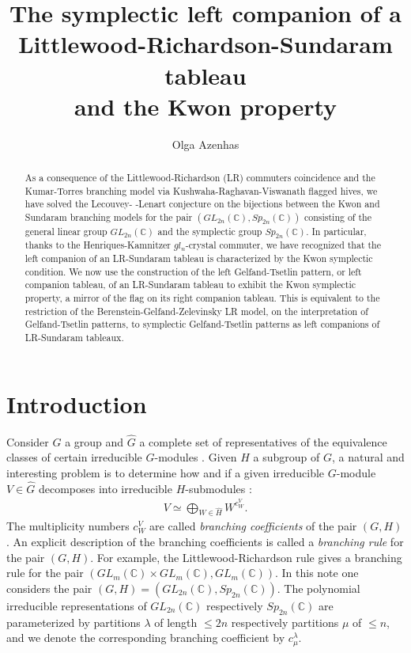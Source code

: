 \documentclass[reqno]{amsart}
\title[The symplectic left companion  of a  LR-Sundaram tableau and the Kwon condition] {The symplectic left companion  of a  Littlewood-Richardson-Sundaram  tableau \\and the Kwon property}
\author{Olga Azenhas}
\theoremstyle{tplain}
\begin{document}
\begin{abstract} As a consequence of the Littlewood-Richardson (LR) commuters coincidence and the Kumar-Torres branching model  via  Kushwaha-Raghavan-Viswanath flagged hives, we have solved the Lecouvey- -Lenart conjecture on the  bijections between the Kwon and Sundaram
  branching models for the pair $({GL}_{2n}(\mathbb{C}), {Sp}_{2n}(\mathbb{C})) $ consisting of  the  general linear group ${GL}_{2n}(\mathbb{C})$
and the symplectic group ${Sp}_{2n}(\mathbb{C})$. In particular, thanks to the Henriques-Kamnitzer $gl_n$-crystal commuter, we have   recognized that the left companion of an LR-Sundaram tableau is characterized by the   Kwon  symplectic condition. We now use the construction of the left Gelfand-Tsetlin pattern, or left companion tableau, of an LR-Sundaram tableau to exhibit the Kwon symplectic property, a mirror of the flag on its right companion tableau. This is equivalent to the  restriction of the Berenstein-Gelfand-Zelevinsky LR model, on the interpretation of Gelfand-Tsetlin patterns, to symplectic Gelfand-Tsetlin patterns as left companions of LR-Sundaram tableaux.
\end{abstract}
\maketitle

\tableofcontents



\section{Introduction}
Consider $G$  a group and $\hat G$ a complete set of representatives of the
equivalence classes of certain irreducible $G$-modules \cite{watanabe}. Given  $H$  a subgroup of $G$, a natural and interesting problem
is to determine how and if a given irreducible $G$-module $V \in \hat G$ decomposes
into irreducible $H$-submodules  \cite{littlewood,sundaram,HTW,kwon18,watanabe,sathishtorres}:
\begin{align}V \simeq \bigoplus_{W\in \hat H}
W^{c^V_{W}}.\nonumber
\end{align}
The multiplicity  numbers $c^V_{W}$ are called \emph{branching coefficients} of the pair $(G,H)$.
An explicit description of the branching coefficients is called a \emph{branching rule} for the pair $(G,H)$. For example, the Littlewood-Richardson rule \cite{LR} gives a branching rule for the pair $({GL}_{m}(\mathbb{C})\times {GL}_{m}(\mathbb{C}), {GL}_{m}(\mathbb{C}))$.
In this note one considers the pair $(G,H)=(GL_{2n}(\mathbb{C}),Sp_{2n}(\mathbb{C}))$. The polynomial irreducible representations of $GL_{2n}(\mathbb{C})$ respectively $Sp_{2n}(\mathbb{C})$ are parameterized by partitions $\lambda$ of length $\le 2n$ respectively partitions $\mu$ of $\le n$, and we denote the corresponding  branching coefficient by $c^\lambda_\mu$.
\end{document}
